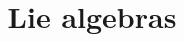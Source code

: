 \documentclass{ximera}
\title{Lie algebras}
\begin{document}
\begin{abstract}

\end{abstract}
\maketitle

\end{document}
